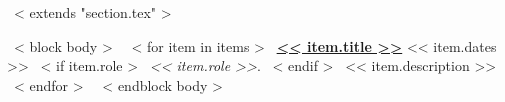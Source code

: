 ~< extends "section.tex" >~

~< block body >~
    ~< for item in items >~
          \href{<< item.url >>}{\textbf{<< item.title >>}} \hfill << item.dates >> \newline
          ~< if item.role >~
          \emph{<< item.role >>}.
          ~< endif >~
          << item.description >>
          \newline
    ~< endfor >~
~< endblock body >~